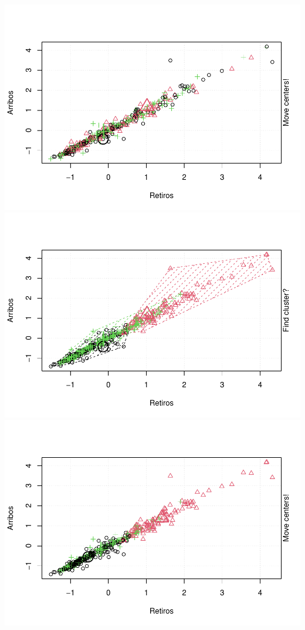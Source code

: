 \documentclass[
]{article}
\begin{document}
\includegraphics{Ecobici_files/figure-latex/unnamed-chunk-12-1.pdf}
\includegraphics{Ecobici_files/figure-latex/unnamed-chunk-12-2.pdf}
\includegraphics{Ecobici_files/figure-latex/unnamed-chunk-12-3.pdf}
\end{document}
